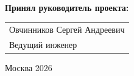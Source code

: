 \begin{titlepage}
\vspace{1em}
{\bf Принял руководитель проекта: \vspace{2mm}}

{
\begin{tabular}{l}
Овчинников Сергей Андреевич\\
Ведущий инженер
\end{tabular}}





\vspace{\fill}

\begin{center}
Москва 2026
\end{center}

\end{titlepage}